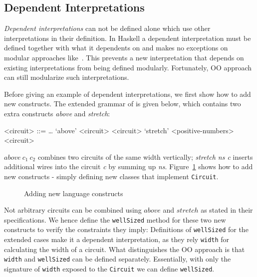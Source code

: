 \subsection{Dependent Interpretations}
 \emph{Dependent interpretations} can not be defined alone which use other
 interpretations in their definition.
In Haskell a dependent interpretation must be defined together with what it
dependents on and makes no exceptions on modular approaches like~\cite{}.
This prevents a new interpretation that depends on existing
interpretations from being defined modularly.
Fortunately, OO approach can still modularize such interpretations.

Before giving an example of dependent interpretations, we first show how to add new
constructs. The extended grammar of \dsl is given below,
which contains two extra constructs \emph{above} and \emph{stretch}:
\setlength{\grammarindent}{5em} %
\begin{grammar}
<circuit> ::= \ldots
\alt `above' <circuit> <circuit>
\alt `stretch' <positive-numbers> <circuit>
\end{grammar}
$above\ c_1\ c_2$ combines two circuits of the same width vertically;
\emph{stretch ns c} inserts additional wires into the circuit \emph{c} by
summing up \emph{ns}.
Figure~\ref{code:variant} shows how to add new constructs - simply defining new classes that implement \lstinline{Circuit}.
\begin{figure}
\caption{Adding new language constructs}
\label{code:variant}
\end{figure}

Not arbitrary circuits can be combined using $above$ and $stretch$
as stated in their specifications.
We hence define the \lstinline{wellSized} method for these two new constructs to
verify the constraints they imply:
Definitions of \lstinline{wellSized} for the extended cases make it a dependent interpretation, as they
rely \lstinline{width} for calculating the width of a circuit.
What distinguishes the OO approach is that \lstinline{width} and \lstinline{wellSized}
can be defined separately. Essentially, with only the signature of
\lstinline{width} exposed to the \lstinline{Circuit} we can
define \lstinline{wellSized}.

